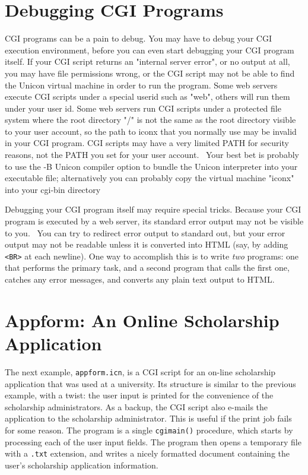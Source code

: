 {\section{Debugging CGI Programs}

CGI programs can be a pain to debug. You may have to debug your CGI
execution environment, before you can even start debugging your CGI
program itself. If your CGI script returns an "internal
server error", or no output at all, you may have file
permissions wrong, or the CGI script may not be able to find the Unicon
virtual machine in order to run the program. Some web servers execute
CGI scripts under a special userid such as
"web", others will run them under your user
id. Some web servers run CGI scripts under a protected file system
where the root directory "/" is not the
same as the root directory visible to your user account, so the path to
iconx that you normally use may be invalid in your CGI program. CGI
scripts may have a very limited PATH for security reasons, not the PATH
you set for your user account. \ Your best bet is probably to use the
-B Unicon compiler option to bundle the Unicon interpreter into your
executable file; alternatively you can probably copy the virtual
machine "iconx" into your cgi-bin directory

Debugging your CGI program itself may require special tricks. Because
your CGI program is executed by a web server, its standard error output
may not be visible to you. \ You can try to redirect error output to
standard out, but your error output may not be readable unless it is
converted into HTML (say, by adding
\texttt{{\textless}BR{\textgreater}} at each newline). One way to
accomplish this is to write \textit{two} programs: one that performs
the primary task, and a second program that calls the first one,
catches any error messages, and converts any plain text output to HTML.

\section{Appform: An Online Scholarship Application}

The next example, \texttt{appform.icn}, is a CGI script for an
on-line scholarship application that was used at a university. Its
structure is similar to the previous example, with a twist:
the user input is printed for the convenience of the scholarship
administrators. As a backup, the CGI script also e-mails the
application to the scholarship administrator. This is useful if the
print job fails for some reason.
The program is a single \texttt{cgimain()} procedure, which starts by
processing each of the user input fields. The program then opens a
temporary file with a \texttt{.txt} extension, and writes a nicely
formatted document containing the user's scholarship
application information.

}
